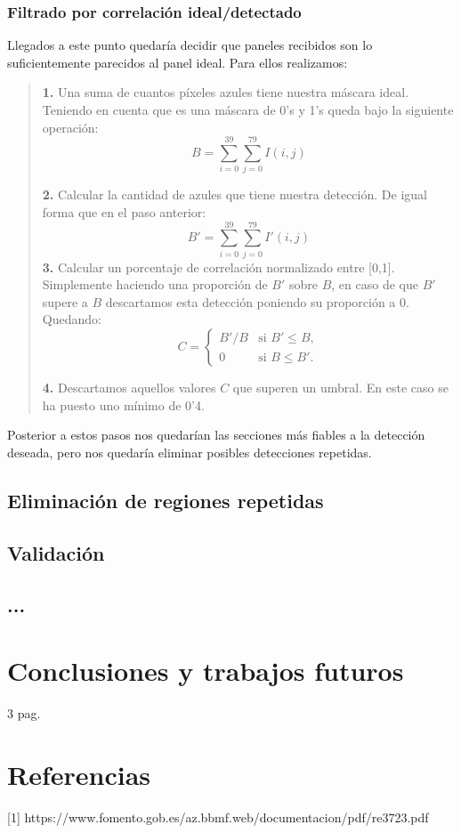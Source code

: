 \documentclass[a4paper, 12pt]{article}
\begin{document}
\subsubsection{Filtrado por correlación ideal/detectado}
Llegados a este punto quedaría decidir que paneles recibidos son lo suficientemente parecidos al panel ideal. Para ellos realizamos:
\begin{quote}
	\textbf{1.} Una suma de cuantos píxeles azules tiene nuestra máscara ideal. Teniendo en cuenta que es una máscara de 0's y 1's queda bajo la siguiente operación:
	\begin{equation}
		B = \sum_{i = 0}^{39}\sum_{j = 0}^{79} I(i, j)
	\end{equation}
	
	\textbf{2.} Calcular la cantidad de azules que tiene nuestra detección. De igual forma que en el paso anterior:
	\begin{equation}
		B' = \sum_{i = 0}^{39}\sum_{j = 0}^{79} I'(i, j)
	\end{equation}
	\textbf{3.} Calcular un porcentaje de correlación normalizado entre [0,1]. Simplemente haciendo una proporción de $B'$ sobre $B$, en caso de que $B'$ supere a $B$ descartamos esta detección poniendo su proporción a 0. Quedando:
	\begin{equation}
		C = 
		\begin{cases} 
			B'/B & \text{si } B' \leq B, \\
			0 & \text{si } B \leq B'.
		\end{cases}
	\end{equation}
	
	\textbf{4.} Descartamos aquellos valores $C$ que superen un umbral. En este caso se ha puesto uno mínimo de 0'4.
\end{quote}

Posterior a estos pasos nos quedarían las secciones más fiables a la detección deseada, pero nos quedaría eliminar posibles detecciones repetidas.
\subsection{Eliminación de regiones repetidas}

\subsection{Validación}

\subsection{...}


\section{Conclusiones y trabajos futuros}
3 pag.
\section{Referencias}
[1] https://www.fomento.gob.es/az.bbmf.web/documentacion/pdf/re3723.pdf
\end{document}
